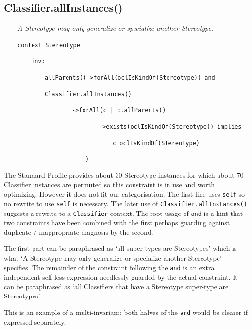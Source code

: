 \documentclass[
]{ceurart}
\begin{document}
\subsection{Classifier.allInstances()}

\begin{description}[itemsep=-0.2cm]\small
\item ~~~~\textit{A Stereotype may only generalize or specialize another Stereotype.}
\item 
\item ~~~~\verb!context Stereotype!
\item ~~~~~~~~\verb!inv:!
\item ~~~~~~~~~~~~\verb!allParents()->forAll(oclIsKindOf(Stereotype)) and!
\item ~~~~~~~~~~~~\verb!Classifier.allInstances()!
\item ~~~~~~~~~~~~~~~~~~~~\verb!->forAll(c | c.allParents()!
\item ~~~~~~~~~~~~~~~~~~~~~~~~~~~~\verb!->exists(oclIsKindOf(Stereotype)) implies!
\item ~~~~~~~~~~~~~~~~~~~~~~~~~~~~~~~~\verb!c.oclIsKindOf(Stereotype)!
\item ~~~~~~~~~~~~~~~~~~~~~~~~\verb!)!
\end{description}

The Standard Profile provides about 30 Stereotype instances for which about 70 Classifier instances are permuted so this constraint is in use and worth optimizing. However it does not fit our categorisation. The first line uses \verb!self! so no rewrite to use \verb!self! is necessary. The later use of \verb!Classifier.allInstances()! suggests a rewrite to a \verb!Classifier! context. The root usage of \verb!and! is a hint that two constraints have been combined with the first perhaps guarding against duplicate / inappropriate diagnosis by the second.

The first part can be paraphrased as `all-super-types are Stereotypes' which is what `A Stereotype may only generalize or specialize another Stereotype' specifies. The remainder of the constraint following the \verb!and! is an extra independent self-less expression needlessly guarded by the actual constraint. It can be paraphrased as `all Classifiers that have a Stereotype super-type are Stereotypes'.

This is an example of a multi-invariant; both halves of the \verb!and! would be clearer if expressed separately.
\end{document}
